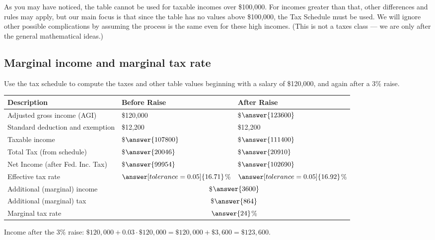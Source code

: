 \documentclass[12pt]{ximera}
\begin{document}
As you may have noticed, the table cannot be used for taxable incomes over \$100,000.
For incomes greater than that, other differences and rules may apply, but our main
focus is that since the table has no values above \$100,000, the Tax Schedule must be
used. We will ignore other possible complications by assuming the process is the same
even for these high incomes. (This is not a taxes class --- we are only after the
general mathematical ideas.)

\subsection*{Marginal income and marginal tax rate}

\begin{problem}
Use the tax schedule to compute the taxes and other table values beginning with a
salary of \$120,000, and again after a $3\%$ raise.

\begin{center}
\begin{tabular}{|l|l|l|}
\hline
Description & Before Raise & After Raise \\
\hline
Adjusted gross income (AGI) & \$120,000 & \$$\answer{123600}$ \\
\hline
Standard deduction and exemption & \$12,200 & \$12,200 \\
\hline
Taxable income & \$$\answer{107800}$ & \$$\answer{111400}$ \\
\hline
Total Tax (from schedule) & \$$\answer{20046}$ & \$$\answer{20910}$ \\
\hline
Net Income (after Fed. Inc. Tax) & \$$\answer{99954}$ & \$$\answer{102690}$ \\
\hline
Effective tax rate & $\answer[tolerance=0.05]{16.71}$\% & $\answer[tolerance=0.05]{16.92}$\% \\
\hline
Additional (marginal) income & \multicolumn{2}{c|}{\$$\answer{3600}$} \\
\hline
Additional (marginal) tax & \multicolumn{2}{c|}{\$$\answer{864}$} \\
\hline
Marginal tax rate & \multicolumn{2}{c|}{$\answer{24}$\%} \\
\hline
\end{tabular}
\end{center}

\begin{solution}
Income after the $3\%$ raise:
$\$120{,}000 + 0.03 \cdot \$120{,}000 = \$120{,}000 + \$3{,}600 = \$123{,}600$.


\end{solution}
\end{problem}
\end{document}
